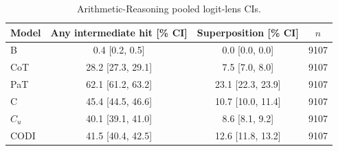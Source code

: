 \begin{table}[h!]
\centering
\small
\setlength{\tabcolsep}{5pt}
\caption{Arithmetic-Reasoning pooled logit-lens CIs.}
\begin{tabular}{lccc}
\toprule
Model & Any intermediate hit [\% CI] & Superposition [\% CI] & $n$ \\
\midrule
B & 0.4 [0.2, 0.5] & 0.0 [0.0, 0.0] & 9107 \\
CoT & 28.2 [27.3, 29.1] & 7.5 [7.0, 8.0] & 9107 \\
PaT & 62.1 [61.2, 63.2] & 23.1 [22.3, 23.9] & 9107 \\
C & 45.4 [44.5, 46.6] & 10.7 [10.0, 11.4] & 9107 \\
$C_u$ & 40.1 [39.1, 41.0] & 8.6 [8.1, 9.2] & 9107 \\
CODI & 41.5 [40.4, 42.5] & 12.6 [11.8, 13.2] & 9107 \\
\bottomrule
\end{tabular}
\label{tab:logit_lens_gsm_pooled_stats}
\end{table}